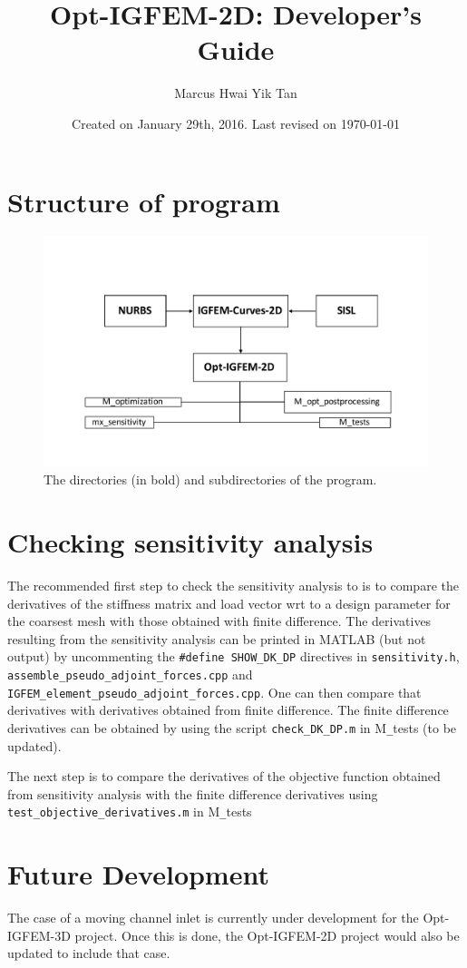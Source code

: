 \documentclass[11pt,letterpaper]{article}
\title{Opt-IGFEM-2D: Developer's Guide}
\author{Marcus Hwai Yik Tan }
\date{Created on January 29th, 2016. Last revised on \today}
\begin{document}
\maketitle
\section{Structure of program}
\begin{figure}[!h]
\centering
\includegraphics[width=\linewidth]{CodeStructure.pdf}
\caption{The directories (in bold) and subdirectories of the program. \label{fig_code_structure}}
\end{figure}

\section{Checking sensitivity analysis} 
The recommended first step to check the sensitivity analysis to is to compare the derivatives of the stiffness matrix and load vector wrt to a design parameter for the coarsest mesh with those obtained with finite difference. The derivatives resulting from the sensitivity analysis can be printed in MATLAB (but not output) by uncommenting the \texttt{\#define SHOW\_DK\_DP} directives in \texttt{sensitivity.h}, \texttt{assemble\_pseudo\_adjoint\_forces.cpp} and \texttt{IGFEM\_element\_pseudo\_adjoint\_forces.cpp}. One can then compare that derivatives with derivatives obtained from finite difference. The finite difference derivatives can be obtained by using the script \texttt{check\_DK\_DP.m}  in M\texttt{\_}tests (to be updated). 

The next step is to compare the derivatives of the objective function obtained from sensitivity analysis with the finite difference derivatives using \texttt{test\_objective\_derivatives.m} in  M\texttt{\_}tests
\section{Future Development}
The case of a moving channel inlet is currently under development for the Opt-IGFEM-3D project. Once this is done, the Opt-IGFEM-2D project would also be updated to include that case. 

\FloatBarrier    
\end{document}
